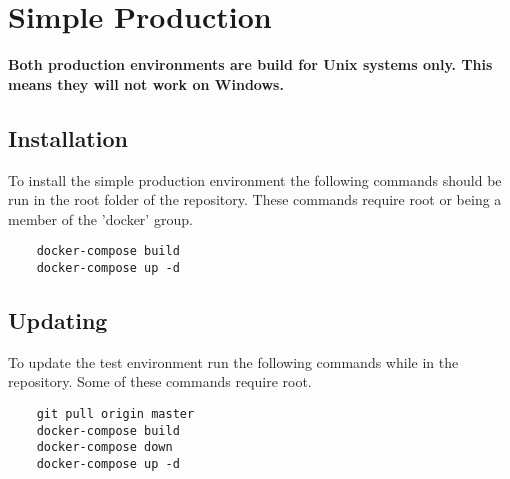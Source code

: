 \section{Simple Production}

\textbf{Both production environments are build for Unix systems only.  This means they will not work on Windows.}

\subsection{Installation}

To install the simple production environment the following commands should be run in the root folder of the repository.  These commands require root or being a member of the 'docker' group.

\begin{verbatim}
	docker-compose build
	docker-compose up -d
\end{verbatim}

\subsection{Updating}

To update the test environment run the following commands while in the repository.  Some of these commands require root.

\begin{verbatim}
	git pull origin master
	docker-compose build
	docker-compose down
	docker-compose up -d
\end{verbatim}
